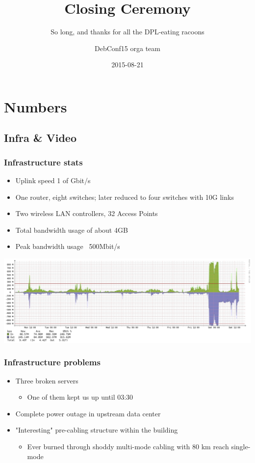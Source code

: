 \documentclass[t]{beamer}
\title{Closing Ceremony}
\subtitle{So long, and thanks for all the DPL-eating racoons}
\author{DebConf15 orga team}
\date{2015-08-21}
\begin{document}
\setcounter{tocdepth}{1}

\begin{frame}
	\titlepage
\end{frame}

\section{Numbers}


\subsection{Infra \& Video}

\begin{frame}
	\frametitle{Infrastructure stats}
	\begin{itemize}
		\item Uplink speed 1 of Gbit/s
		\item One router, eight switches; later reduced to four switches with 10G links
		\item Two wireless LAN controllers, 32 Access Points
		\item Total bandwidth usage of about 4GB
		\item Peak bandwidth usage ~500Mbit/s
	\end{itemize}
	\begin{center}
	\includegraphics[scale=0.2]{weekly2.pdf}
	\end{center}
\end{frame}

\begin{frame}
	\frametitle{Infrastructure problems}
	\begin{itemize}
		\item Three broken servers
		\begin{itemize}
			\item One of them kept us up until 03:30
		\end{itemize}
		\item Complete power outage in upstream data center
		\item "Interesting" pre-cabling structure within the building
		\begin{itemize}
			\item Ever burned through shoddy multi-mode cabling with 80 km reach single-mode 
		\end{itemize}
	\end{itemize}
\end{frame}
\end{document}
